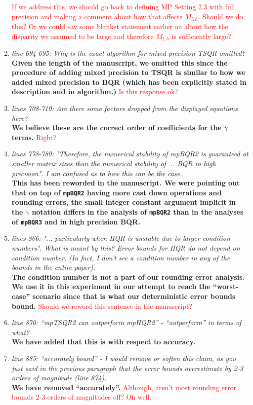 \documentclass[final,onefignum,onetabnum]{siamart190516}
\newcommand{\red}[1]{\textcolor{red}{#1}}
\begin{document}
\begin{enumerate}
    \red{If we address this, we should go back to defining MP Setting 2.3 with full precision and making a comment about how that affects $M_{l,h}$. Should we do this? Or we could say some blanket statement earlier on about how the disparity we assumed to be large and therefore $M_{l,h}$ is sufficiently large?}
    \item {\it line 694-695: Why is the exact algorithm for mixed precision TSQR omitted? }\\
    {\bf Given the length of the manuscript, we omitted this since the procedure of adding mixed precision to TSQR is similar to how we added mixed precision to BQR (which has been explicitly stated in description and in algorithm.)} \red{Is this response ok?}
    \item {\it lines 708-710: Are there some factors dropped from the displayed equations here? }\\
    {\bf We believe these are the correct order of coefficients for the $\tilde{\gamma}$ terms.} \red{ Right?}
    \item {\it lines 778-780: "Therefore, the numerical stability of mpBQR2 is guaranteed at smaller matrix sizes than the numerical stability of ... BQR in high precision". I am confused as to how this can be the case. }\\
    {\bf This has been reworded in the manuscript. We were pointing out that on top of {\tt mpBQR2} having more cast down operations and rounding errors, the small integer constant argument implicit in the $\tilde{\gamma}$ notation differs in the analysis of {\tt mpBQR2} than in the analyses of {\tt mpBQR3} and in high precision BQR.}
    \item {\it lines 866: "... particularly when HQR is unstable due to larger condition numbers". What is meant by this? Error bounds for HQR do not depend on condition number. (In fact, I don't see a condition number in any of the bounds in the entire paper). }\\
    {\bf The condition number is not a part of our rounding error analysis. We use it in this experiment in our attempt to reach the ``worst-case'' scenario since that is what our deterministic error bounds bound. } \red{Should we reword this sentence in the manuscript?}
    \item {\it line 870: ``mpTSQR2 can outperform mpHQR2'' - ``outperform'' in terms of what? } \\
    {\bf We have added that this is with respect to accuracy.}
    \item {\it line 885: ``accurately bound'' - I would remove or soften this claim, as you just said in the previous paragraph that the error bounds overestimate by 2-3 orders of magnitude (line 874).}\\
    {\bf We have removed ``accurately''.} \red{Although, aren't most rounding error bounds 2-3 orders of magnitudes off? Oh well.}
\end{enumerate}
\end{document}
